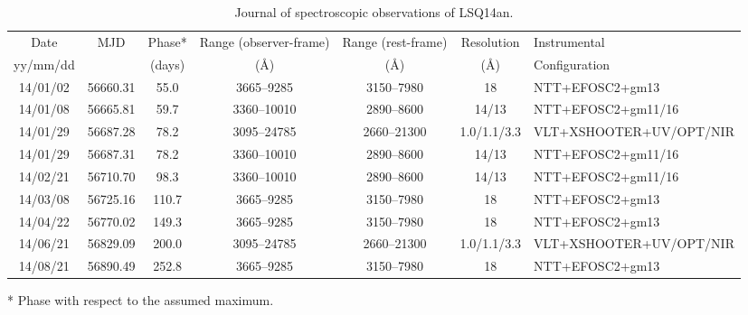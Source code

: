 \documentclass[useAMS,usenatbib]{mn2e}
\def\an{LSQ14an}
\begin{document}
\begin{table*}
\caption{Journal of spectroscopic observations of \an.}
\begin{center}
\begin{tabular}{ccccccl}
\hline
Date & MJD & Phase* &Range (observer-frame) & Range (rest-frame) &Resolution & Instrumental\\
yy/mm/dd &  & (days)  &(\AA) &(\AA)  & (\AA) &Configuration\\
\hline
14/01/02 &       56660.31 & 55.0 & 3665--9285 &3150--7980 & 18 & NTT+EFOSC2+gm13\\                  
14/01/08&        56665.81        & 59.7  & 3360--10010 & 2890--8600  & 14/13 & NTT+EFOSC2+gm11/16         \\  
14/01/29&       56687.28        & 78.2  & 3095--24785 &2660--21300   & 1.0/1.1/3.3 & VLT+XSHOOTER+UV/OPT/NIR \\                                                                                  
14/01/29&       56687.31         &  78.2  &  3360--10010 & 2890--8600  &  14/13   & NTT+EFOSC2+gm11/16      \\                                                                                                                                                          
14/02/21&        56710.70 & 98.3 &  3360--10010 &2890--8600 &  14/13  & NTT+EFOSC2+gm11/16  \\                       
14/03/08  &      56725.16 & 110.7& 3665--9285 &3150--7980&   18 & NTT+EFOSC2+gm13\\                                                       
14/04/22&         56770.02  &149.3& 3665--9285 &3150--7980&18 & NTT+EFOSC2+gm13\\                                                                                        
14/06/21 &       56829.09&  200.0 & 3095--24785 &2660--21300  & 1.0/1.1/3.3  & VLT+XSHOOTER+UV/OPT/NIR\\                                      
14/08/21 &       56890.49 & 252.8 & 3665--9285 &3150--7980   & 18 & NTT+EFOSC2+gm13\\                                                                                                                                       
\hline
\end{tabular}
\end{center}
* Phase with respect to the assumed maximum.
\label{table:sp}
\end{table*}%
\end{document}
